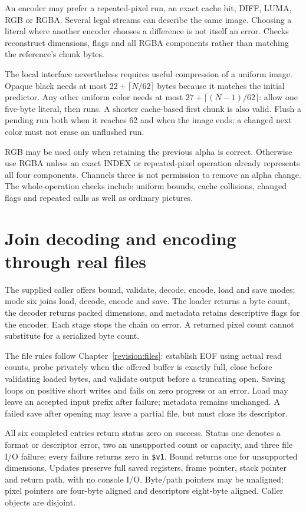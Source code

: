 An encoder may prefer a repeated-pixel run, an exact cache hit, DIFF, LUMA,
RGB or RGBA. Several legal streams can describe the same image. Choosing a
literal where another encoder chooses a difference is not itself an error.
Checks reconstruct dimensions, flags and all RGBA components rather than
matching the reference's chunk bytes.

The local interface nevertheless requires useful compression of a uniform
image. Opaque black needs at most $22+\lceil N/62\rceil$ bytes because it matches
the initial predictor. Any other uniform color needs at most
$27+\lceil(N-1)/62\rceil$: allow one five-byte literal, then runs. A shorter
cache-based first chunk is also valid. Flush a pending run both when it reaches
62 and when the image ends; a changed next color must not erase an unflushed run.

RGB may be used only when retaining the previous alpha is correct. Otherwise
use RGBA unless an exact INDEX or repeated-pixel operation already represents
all four components. Channels three is not permission to remove an alpha change.
The whole-operation checks include uniform bounds, cache collisions, changed
flags and repeated calls as well as ordinary pictures.

\section{Join decoding and encoding through real files}

The supplied caller offers bound, validate, decode, encode, load and save modes;
mode six joins load, decode, encode and save. The loader returns a byte count,
the decoder returns packed dimensions, and metadata retains descriptive flags
for the encoder. Each stage stops the chain on error. A returned pixel count
cannot substitute for a serialized byte count.

The file rules follow Chapter~\ref{revision:files}: establish EOF using actual
read counts, probe privately when the offered buffer is exactly full, close
before validating loaded bytes, and validate output before a truncating open.
Saving loops on positive short writes and fails on zero progress or an error.
Load may leave an accepted input prefix after failure; metadata remains unchanged.
A failed save after opening may leave a partial file, but must close its descriptor.

All six completed entries return status zero on success. Status one denotes a
format or descriptor error, two an unsupported count or capacity, and three file
I/O failure; every failure returns zero in \texttt{\$v1}. Bound returns one for
unsupported dimensions. Updates preserve full saved registers, frame pointer,
stack pointer and return path, with no console I/O. Byte/path pointers may be
unaligned; pixel pointers are four-byte aligned and descriptors eight-byte aligned.
Caller objects are disjoint.

